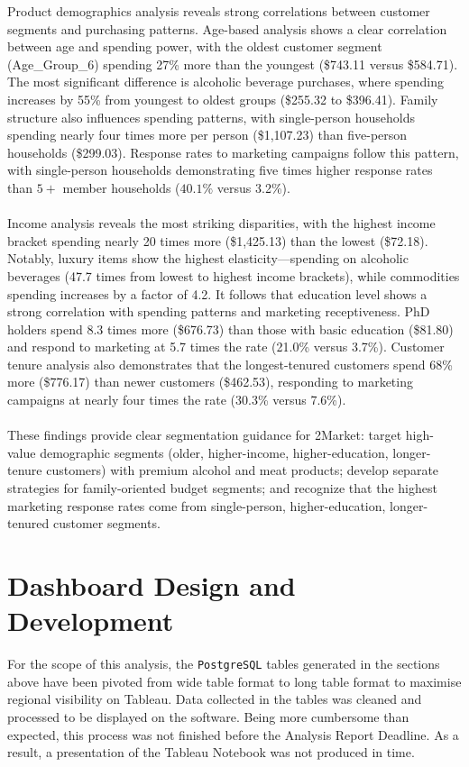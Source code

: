 \documentclass[12pt,a4paper]{article}
\newcommand{\textittt}[1]{\texttt{#1}}
\begin{document}
\noindent Product demographics analysis reveals strong correlations between customer segments and purchasing patterns. Age-based analysis shows a clear correlation between age and spending power, with the oldest customer segment (Age\_Group\_6) spending 27\% more than the youngest (\$743.11 versus \$584.71). The most significant difference is alcoholic beverage purchases, where spending increases by 55\% from youngest to oldest groups (\$255.32 to \$396.41). Family structure also influences spending patterns, with single-person households spending nearly four times more per person (\$1,107.23) than five-person households (\$299.03). Response rates to marketing campaigns follow this pattern, with single-person households demonstrating five times higher response rates than $5+$ member households ($40.1\%$  versus 3.2\%).\\
\\
Income analysis reveals the most striking disparities, with the highest income bracket spending nearly 20 times more (\$1,425.13) than the lowest (\$72.18). Notably, luxury items show the highest elasticity—spending on alcoholic beverages (47.7 times from lowest to highest income brackets), while commodities spending increases by a factor of 4.2. It follows that education level shows a strong correlation with spending patterns and marketing receptiveness. PhD holders spend 8.3 times more (\$676.73) than those with basic education (\$81.80) and respond to marketing at 5.7 times the rate (21.0\% versus 3.7\%). Customer tenure analysis also demonstrates that the longest-tenured customers spend 68\% more (\$776.17) than newer customers (\$462.53), responding to marketing campaigns at nearly four times the rate (30.3\% versus 7.6\%).\\
\\
These findings provide clear segmentation guidance for 2Market: target high-value demographic segments (older, higher-income, higher-education, longer-tenure customers) with premium alcohol and meat products; develop separate strategies for family-oriented budget segments; and recognize that the highest marketing response rates come from single-person, higher-education, longer-tenured customer segments.
\clearpage
\newpage

\section{Dashboard Design and Development}
For the scope of this analysis, the \textittt{PostgreSQL} tables generated in the sections above have been pivoted from wide table format to long table format to maximise regional visibility on Tableau. Data collected in the tables was cleaned and processed to be displayed on the software. Being more cumbersome than expected, this process was not finished before the Analysis Report Deadline. As a result, a presentation of the Tableau Notebook was not produced in time.
\end{document}

